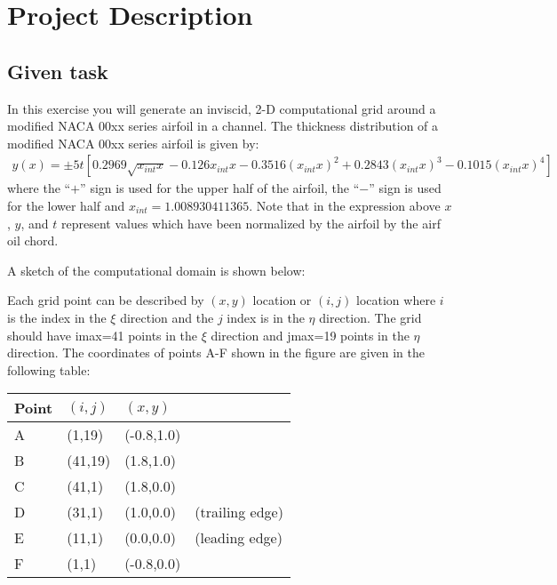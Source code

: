 \documentclass[letterpaper,10pt,english]{sphinxmanual}
\begin{document}
\section{Project Description}
\label{\detokenize{background::doc}}\label{\detokenize{background:project-description}}

\subsection{Given task}
\label{\detokenize{background:given-task}}
In this exercise you will generate an inviscid, 2-D computational grid around a modified NACA 00xx series airfoil in a channel. The thickness distribution of a modified NACA 00xx series airfoil is given by:
\begin{equation*}
\begin{split}y(x) = \pm 5t [0.2969 \sqrt{x_{int}x} - 0.126 x_{int} x - 0.3516 (x_{int}x)^{2} + 0.2843(x_{int}x)^{3} - 0.1015 (x_{int}x)^{4}]\end{split}
\end{equation*}
where the “\(+\)” sign is used for the upper half of the airfoil, the “\(-\)” sign is used for the lower half and \(x_{int} = 1.008930411365\). Note that in the expression above \(x\), \(y\), and \(t\) represent values which have been normalized by the airfoil by the airf
oil chord.

A sketch of the computational domain is shown below:
\begin{figure}[htbp]
\centering

\noindent{}
\end{figure}

Each grid point can be described by \((x,y)\) location or \((i,j)\) location where \(i\) is the index in the \(\xi\) direction and the \(j\) index is in the \(\eta\) direction. The grid should have imax=41 points in the \(\xi\) direction and jmax=19 points in the \(\eta\) direction. The coordinates of points A-F shown in the figure are given in the following table:


\begin{savenotes}\sphinxattablestart
\centering
\begin{tabulary}{\linewidth}[t]{|T|T|T|T|}
\hline

Point
&
\((i,j)\)
&
\((x,y)\)
&\\
\hline
A
&
(1,19)
&
(-0.8,1.0)
&\\
\hline
B
&
(41,19)
&
(1.8,1.0)
&\\
\hline
C
&
(41,1)
&
(1.8,0.0)
&\\
\hline
D
&
(31,1)
&
(1.0,0.0)
&
(trailing edge)
\\
\hline
E
&
(11,1)
&
(0.0,0.0)
&
(leading edge)
\\
\hline
F
&
(1,1)
&
(-0.8,0.0)
&\\
\hline
\end{tabulary}
\par
\sphinxattableend\end{savenotes}
\end{document}
